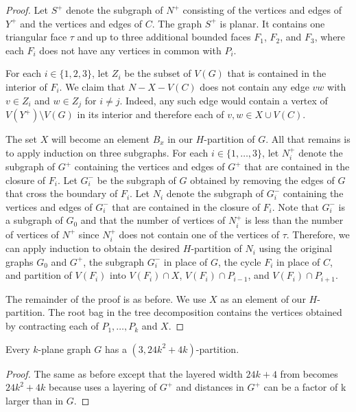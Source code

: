 \documentclass{patmorin}
\begin{document}
\begin{proof}
  Let $S^+$ denote the subgraph of $N^+$ consisting of the vertices and edges of $Y^+$ and the vertices and edges of $C$.  The graph $S^+$ is planar. It contains one triangular face $\tau$ and up to three additional bounded faces $F_1$, $F_2$, and $F_3$, where each $F_i$ does not have any vertices in common with $P_i$.
  
  For each $i\in\{1,2,3\}$, let $Z_i$ be the subset of $V(G)$ that is contained in the interior of $F_i$.  We claim that $N-X-V(C)$ does not contain any edge $vw$ with $v\in Z_i$ and $w\in Z_j$ for $i\neq j$.  Indeed, any such edge would contain a vertex of $V(Y^+)\setminus V(G)$ in its interior and therefore each of $v,w\in X\cup V(C)$.

  The set $X$ will become an element $B_x$ in our $H$-partition of $G$.  All that remains is to apply induction on three subgraphs.  For each $i\in\{1,\ldots,3\}$, let $N_i^+$ denote the subgraph of $G^+$ containing the vertices and edges of $G^+$ that are contained in the closure of $F_i$.  
  Let $G_i^-$ be the subgraph of $G$ obtained by removing the edges of $G$ that cross the boundary of $F_i$.  
  Let $N_i$ denote the subgraph of $G_i^-$ containing the vertices and edges of $G_i^-$ that are contained in the closure of $F_i$.  Note that $G_i^-$ is a subgraph of $G_0$ and that the number of vertices of $N_i^+$ is less than the number of vertices of $N^+$ since $N_i^+$ does not contain one of the vertices of $\tau$.  Therefore, we can apply induction to obtain the desired $H$-partition of $N_i$ using the original graphs $G_0$ and $G^+$, the subgraph $G_i^-$ in place of $G$, the cycle $F_i$ in place of $C$, and partition of $V(F_i)$ into $V(F_i)\cap X$, $V(F_i)\cap P_{i-1}$, and $V(F_i)\cap P_{i+1}$.
  
  The remainder of the proof is as before. We use $X$ as an element of our $H$-partition. The root bag in the tree decomposition contains the vertices obtained by contracting each of $P_1,\ldots,P_k$ and $X$.
\end{proof}


\begin{thm}
  Every $k$-plane graph $G$ has a $(3, 24k^2+4k)$-partition.
\end{thm}

\begin{proof}
  The same as before except that the layered width $24k+4$ from  becomes $24k^2+4k$ because  uses a layering of $G^+$ and distances in $G^+$ can be a factor of k larger than in $G$.
\end{proof}
\end{document}
